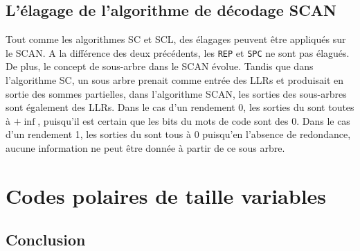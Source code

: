 \subsection{L'élagage de l'algorithme de décodage SCAN}
Tout comme les algorithmes SC et SCL, des élagages peuvent être appliqués sur le SCAN. A la différence des deux précédents, les \noeuds \texttt{REP} et \texttt{SPC} ne sont pas élagués. De plus, le concept de sous-arbre dans le SCAN évolue. Tandis que dans l'algorithme SC, un sous arbre prenait comme entrée des LLRs et produisait en sortie des sommes partielles, dans l'algorithme SCAN, les sorties des sous-arbres sont également des LLRs. Dans le cas d'un rendement 0, les sorties du \noeud sont toutes à $+\inf$, puisqu'il est certain que les bits du mots de code sont des $0$. Dans le cas d'un rendement 1, les sorties du \noeud sont tous à $0$ puisqu'en l'absence de redondance, aucune information ne peut être donnée à partir de ce sous arbre.

\section{Codes polaires de taille variables}


\subsection*{Conclusion}
{}